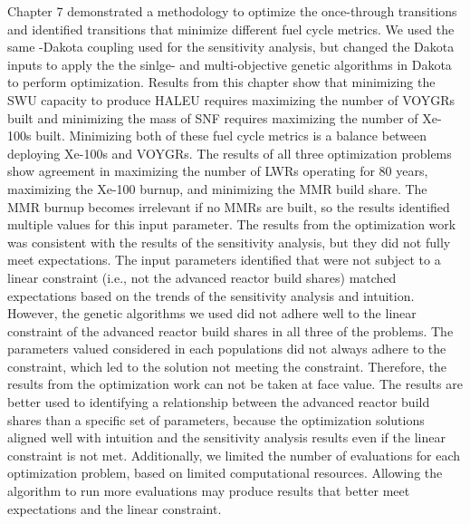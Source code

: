 Chapter 7 demonstrated a methodology to optimize the once-through 
transitions and identified transitions that minimize different 
fuel cycle metrics. We used the same \Cyclus-Dakota coupling used 
for the sensitivity analysis, but changed the Dakota inputs 
to apply the the sinlge- and multi-objective 
genetic algorithms in Dakota to perform optimization. 
Results from this chapter show that minimizing the 
\gls{SWU} capacity to produce \gls{HALEU} requires maximizing the number of 
VOYGRs built and minimizing the mass of \gls{SNF} requires maximizing the number 
of Xe-100s built. Minimizing both of these fuel cycle metrics is a 
balance between deploying Xe-100s and VOYGRs. The results of  
all three optimization problems show agreement in maximizing the number 
of \glspl{LWR} operating for 80 years, maximizing the Xe-100 burnup,
and minimizing the \gls{MMR} build share. The \gls{MMR} burnup becomes
irrelevant if no \glspl{MMR} are built, so the results 
identified multiple values for this input parameter. The results 
from the optimization 
work was consistent with the results of the sensitivity analysis, but 
they did not fully meet expectations. The input parameters identified that 
were not subject to a linear constraint (i.e., not the advanced reactor 
build shares) matched expectations based on the trends of the sensitivity 
analysis and intuition. However, the genetic algorithms we used 
did not adhere well to the linear constraint of the advanced reactor 
build shares in all three of the problems. The parameters valued 
considered in each populations did not always adhere to the constraint, 
which led to the solution not meeting the constraint. Therefore, the 
results from the optimization work can not be taken at face value. 
The results are better used to identifying a relationship between the advanced 
reactor build shares than a specific set of parameters, because the 
optimization solutions aligned well with intuition and the sensitivity 
analysis results even if the linear constraint is not met. Additionally, 
we limited the number of evaluations for each optimization problem,
based on limited computational resources. Allowing the 
algorithm to run more evaluations may produce results that better 
meet expectations and the linear constraint. 

